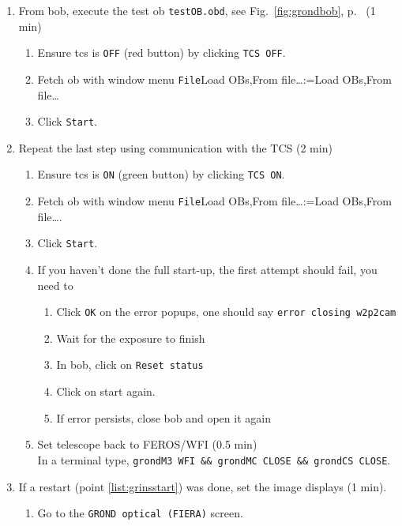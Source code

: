 \documentclass[11pt,fleqn]{book}
\makeatletter
\def\menu#1#2{\texttt{#1}\ifx{}#2\else\@for\@x:=#2\do{$\rightarrow$\texttt{\@x}}\fi}
\def\wmenu#1#2{window menu \menu{#1}{#2}}
\def\figref#1{Fig.~\ref{fig:#1}, p.~\pageref{fig:#1}}
\makeatother
\begin{document}
\begin{enumerate}
\begin{enumerate}
\begin{enumerate}
           \end{enumerate}
         \item From \gls{bob}, execute the test \gls{ob} \texttt{testOB.obd}, see \figref{grondbob} (1 min)
           \begin{enumerate}
             \item Ensure \gls{tcs} is \texttt{OFF} (red button) by clicking \texttt{TCS OFF}.
             \item Fetch \gls{ob} with \wmenu{File}{Load OBs,From file…} 
             \item Click \texttt{Start}.
           \end{enumerate}
         \item Repeat the last step using communication with the TCS (2 min)\label{list:grond-testtcs}
           \begin{enumerate}
             \item Ensure \gls{tcs} is \texttt{ON} (green button) by clicking \texttt{TCS ON}.
             \item Fetch \gls{ob} with \wmenu{File}{Load OBs,From file…}.
             \item Click \texttt{Start}.
             \item If you haven't done the full start-up, the first attempt should fail, you need to
             \begin{enumerate}
                \item Click \texttt{OK} on the error popups, one should say \texttt{error closing w2p2cam}
                \item Wait for the exposure to finish
                \item In \gls{bob}, click on \texttt{Reset status}
                \item Click on start again.
                \item If error persists, close \gls{bob} and open it again
             \end{enumerate} 
             \item Set telescope back to FEROS/WFI (0.5 min)\\
             In a terminal type, \texttt{grondM3 WFI \&\& grondMC CLOSE \&\& grondCS CLOSE}.
           \end{enumerate}
         \item If a restart (point \ref{list:grinsstart}) was done, set the image displays (1 min).
            \begin{enumerate}
               \item Go to the \texttt{GROND optical (FIERA)} screen.

\end{enumerate}
\end{enumerate}
\end{enumerate}
\end{document}

